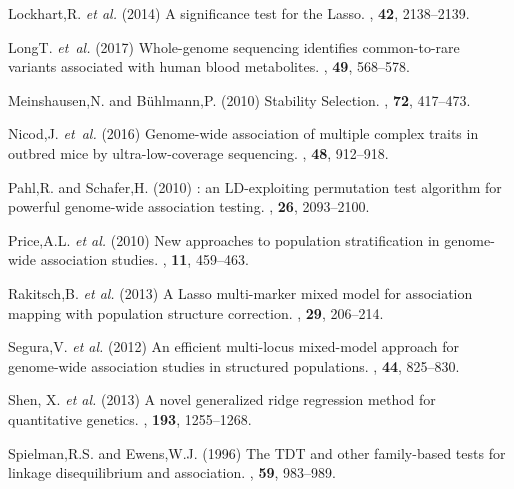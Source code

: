 \documentclass{bioinfo}
\begin{document}
\begin{thebibliography}{}
Lockhart,R. \textit{et al.}  (2014)
\newblock A significance test for the {L}asso.
, {\bf 42}, 2138--2139.

LongT.  {\em et~al.} (2017)
\newblock Whole-genome sequencing identifies common-to-rare variants associated
  with human blood metabolites.
, {\bf 49}, 568--578.

Meinshausen,N. and B{\"u}hlmann,P. (2010)
\newblock Stability {S}election.
, {\bf 72}, 417--473.

Nicod,J.  {\em et~al.} (2016)
\newblock Genome-wide association of multiple complex traits in outbred mice by
  ultra-low-coverage sequencing.
,  {\bf 48}, 912--918.

Pahl,R. and Schafer,H. (2010)
: an {LD}-exploiting permutation test algorithm for powerful
  genome-wide association testing.
, {\bf 26}, 2093--2100.

Price,A.L. \textit{et al.} (2010)
\newblock New approaches to population stratification in genome-wide
  association studies.
, {\bf 11}, 459--463.

Rakitsch,B. \textit{et al.} (2013)
\newblock A {L}asso multi-marker mixed model for association mapping with
  population structure correction.
, {\bf 29}, 206--214.

Segura,V. \textit{et al.} (2012)
\newblock An efficient multi-locus mixed-model approach for genome-wide
  association studies in structured populations.
, {\bf 44}, 825--830.

Shen, X. \textit{et al.} (2013) 
\newblock A novel generalized ridge regression method for quantitative
  genetics.
, {\bf 193}, 1255--1268.

Spielman,R.S. and Ewens,W.J. (1996)
\newblock The {TDT} and other family-based tests for linkage disequilibrium and
  association.
, {\bf 59}, 983--989.


\end{thebibliography}
\end{document}
